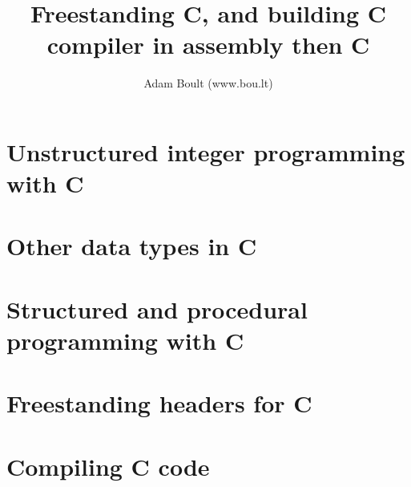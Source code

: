 \documentclass[oneside]{book}
\begin{document}
\author{Adam Boult (www.bou.lt)}
\title{Freestanding C, and building C compiler in assembly then C}
\maketitle

\setcounter{tocdepth}{0}
\tableofcontents



\part{Unstructured integer programming with C}











\part{Other data types in C}






\part{Structured and procedural programming with C}








\part{Freestanding headers for C}











\part{Compiling C code}

\end{document}
